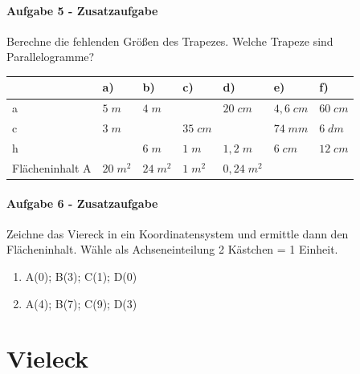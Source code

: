 \documentclass[
  ngerman,
]{book}
\begin{document}
\hypertarget{aufgabe-5---zusatzaufgabe-2}{%
\subsubsection*{\texorpdfstring{Aufgabe 5 - \textbf{Zusatzaufgabe}}{Aufgabe 5 - Zusatzaufgabe}}\label{aufgabe-5---zusatzaufgabe-2}}

Berechne die fehlenden Größen des Trapezes. Welche Trapeze sind Parallelogramme?

\begin{longtable}[]{@{}lllllll@{}}
\toprule
& a) & b) & c) & d) & e) & f)\tabularnewline
\midrule
\endhead
a & \(5\;m\) & \(4\;m\) & & \(20\;cm\) & \(4,6\;cm\) & \(60\;cm\)\tabularnewline
c & \(3\;m\) & & \(35\;cm\) & & \(74\;mm\) & \(6\;dm\)\tabularnewline
h & & \(6\;m\) & \(1\;m\) & \(1,2\;m\) & \(6\;cm\) & \(12\;cm\)\tabularnewline
Flächeninhalt A & \(20\;m^2\) & \(24\;m^2\) & \(1\;m^2\) & \(0,24\;m^2\) & &\tabularnewline
\bottomrule
\end{longtable}

\hypertarget{section-14}{%
\subsubsection*{}\label{section-14}}

\hypertarget{aufgabe-6---zusatzaufgabe-1}{%
\subsubsection*{\texorpdfstring{Aufgabe 6 - \textbf{Zusatzaufgabe}}{Aufgabe 6 - Zusatzaufgabe}}\label{aufgabe-6---zusatzaufgabe-1}}

Zeichne das Viereck in ein Koordinatensystem und ermittle dann den Flächeninhalt. Wähle als Achseneinteilung 2 Kästchen = 1 Einheit.

\begin{enumerate}
\def\labelenumi{\alph{enumi})}
\item
  A(0); B(3); C(1); D(0)
\item
  A(4); B(7); C(9); D(3)
\end{enumerate}

\hypertarget{vieleck}{%
\chapter{Vieleck}\label{vieleck}}
\end{document}
